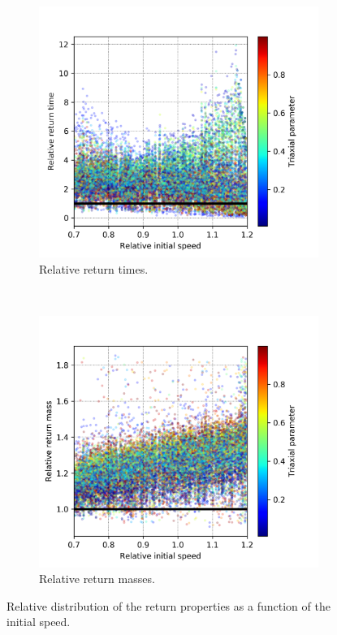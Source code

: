 	\begin{figure}[h]
		\centering
		\begin{subfigure}[b]{0.49\textwidth}
			\includegraphics[width = \textwidth]{"../Files/Week 14/relative_times"}
			\caption{Relative return times.}
		\end{subfigure}
		~ 
		\begin{subfigure}[b]{0.49\textwidth}
			\includegraphics[width = \textwidth]{"../Files/Week 14/relative_mass"}
			\caption{Relative return masses.}
		\end{subfigure}
		\caption{Relative distribution of the return properties as a function of the initial speed.}
		\label{fig: relatives}
	\end{figure}
	
